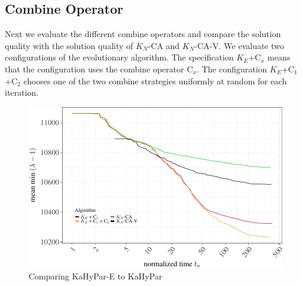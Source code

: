 \documentclass[a4paper,12pt,titlepage, BCOR7mm,headsepline]{scrbook}
\numberwithin{equation}{section}
\begin{document}
\subsection{Combine Operator}
\label{sec:combineoperatorevaluation}
Next we evaluate the different combine operators and compare the solution quality with the solution quality of $K_N$-CA and $K_N$-CA-V. We evaluate two configurations of the evolutionary algorithm. The specification $K_E$+C$_x$ means that the configuration uses the combine operator C$_x$. The configuration $K_E$+C$_1$+C$_2$ chooses one of the two combine strategies uniformly at random for each iteration.
\begin{figure}[H]

\begin{center}
\includegraphics{rnw/tuning_subset_plots/combine_plot-1}\caption{Comparing KaHyPar-E to KaHyPar}\label{fig:combineop}
\end{center} 

\end{figure}
\end{document}
